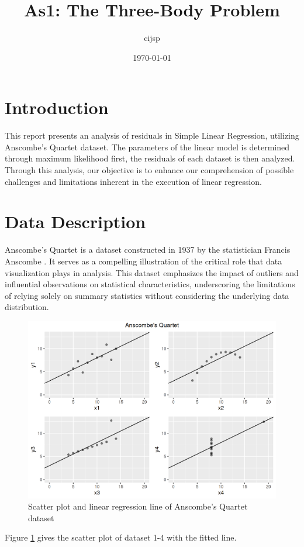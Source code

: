 \documentclass[12pt]{article}
\title{As1: The Three-Body Problem}
\author{cijsp}
\date{\today}
\begin{document}
	
	\maketitle
	
	\section{Introduction}

This report presents an analysis of residuals in Simple Linear Regression, utilizing Anscombe's Quartet dataset. The parameters of the linear model is determined through maximum likelihood first, the residuals of each dataset is then analyzed. Through this analysis, our objective is to enhance our comprehension of possible challenges and limitations inherent in the execution of linear regression.
	
	\section{Data Description}
	
Anscombe's Quartet is a dataset constructed in 1937 by the statistician Francis Anscombe \citep{Anscombe1973}. It serves as a compelling illustration of the critical role that data visualization plays in analysis. This dataset emphasizes the impact of outliers and influential observations on statistical characteristics, underscoring the limitations of relying solely on summary statistics without considering the underlying data distribution.

	
\begin{figure}[htbp]
\includegraphics[width=.7\textwidth]{anscombe.png}
\centering
\caption{Scatter plot and linear regression line of Anscombe's Quartet dataset}
\label{Fig:anscombe}
\end{figure}

Figure \ref{Fig:anscombe} gives the scatter plot of dataset 1-4 with the fitted line.
\end{document}
